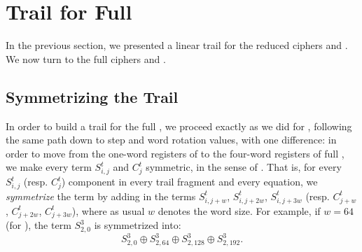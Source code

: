 
\section{Trail for Full \MORUS}
\label{sec/fulltrails}

In the previous section, we presented a linear trail for the reduced ciphers \MiniMORUS[1280] and \MiniMORUS[640]. We now turn to the full ciphers \MORUS[1280] and \MORUS[640].

\subsection{Symmetrizing the Trail}
In order to build a trail for the full \MORUS, we proceed exactly as we did for \MiniMORUS, following the same path down to step and word rotation values, with one difference: in order to move from the one-word registers of \MiniMORUS to the four-word registers of full \MORUS, we make every term $S^t_{i,j}$ and $C^t_j$ symmetric, in the sense of .
That is, for every $S^t_{i,j}$ (resp. $C^t_j$) component in every trail fragment and every equation, we \emph{symmetrize} the term by adding in the terms $S^t_{i,j+w}$, $S^t_{i,j+2w}$, $S^t_{i,j+3w}$ (resp. $C^t_{j+w}$, $C^t_{j+2w}$, $C^t_{j+3w}$), where as usual $w$ denotes the word size. For example, if $w=64$ (for \MORUS[1280]), the term $S^3_{2,0}$ is symmetrized into:
\[
S^3_{2,0} \oplus S^3_{2,64} \oplus S^3_{2,128} \oplus S^3_{2,192}.
\]

